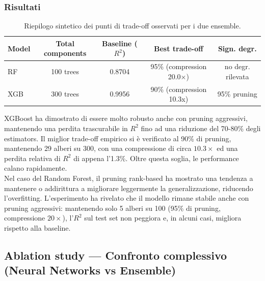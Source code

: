 \documentclass[a4paper,12pt]{report}
\begin{document}
	\subsubsection{Risultati}
	\begin{table}[H]
		\centering
		\setlength{\tabcolsep}{2pt}
		\begin{tabular}{lcccc}
			\toprule
			\textbf{Model} & \textbf{Total components} & \textbf{Baseline (\(R^2\))} & \textbf{Best trade-off} & \textbf{Sign. degr.} \\
			\midrule
			RF        & 100 trees & 0.8704 & 95\% (compression 20.0×) & no degr. rilevata \\
			XGB       & 300 trees & 0.9956 & 90\% (compression 10.3x) & 95\% pruning \\
			\bottomrule
		\end{tabular}
		\caption{Riepilogo sintetico dei punti di trade-off osservati per i due ensemble.}
	\end{table}
	
	XGBoost ha dimostrato di essere molto robusto anche con pruning aggressivi, mantenendo una perdita trascurabile in \(R^2\) fino ad una riduzione del 70-80\% degli estimators. Il miglior trade-off empirico si è verificato al 90\% di pruning, mantenendo 29 alberi su 300, con una compressione di circa $10.3\times$ ed una perdita relativa di \(R^2\) di appena l'1.3\%. Oltre questa soglia, le performance calano rapidamente. \\
	Nel caso del Random Forest, il pruning rank-based ha mostrato una tendenza a mantenere o addirittura a migliorare leggermente la generalizzazione, riducendo l'overfitting. L'esperimento ha rivelato che il modello rimane stabile anche con pruning aggressivi: mantenendo solo 5 alberi su 100 (95\% di pruning, compressione $20\times$), l'\(R^2\) sul test set non peggiora e, in alcuni casi, migliora rispetto alla baseline.
	
	\subsection{Ablation study — Confronto complessivo (Neural Networks vs Ensemble)}
	
\end{document}
